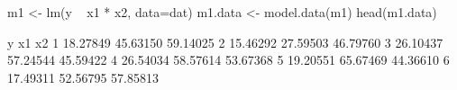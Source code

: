 \begin{Schunk}
\begin{Sinput}
 m1 <- lm(y ~ x1 * x2, data=dat)
 m1.data <- model.data(m1)
 head(m1.data)
\end{Sinput}
\begin{Soutput}
         y       x1       x2
1 18.27849 45.63150 59.14025
2 15.46292 27.59503 46.79760
3 26.10437 57.24544 45.59422
4 26.54034 58.57614 53.67368
5 19.20551 65.67469 44.36610
6 17.49311 52.56795 57.85813
\end{Soutput}
\end{Schunk}
